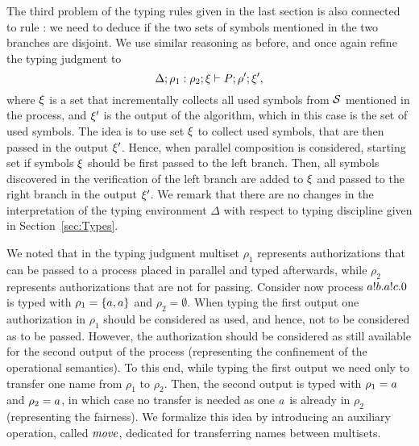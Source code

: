 The third problem of the typing rules given in the last section is also connected to rule : we need to deduce if the two sets of symbols mentioned in the two branches are disjoint. We use similar reasoning as before, and once again refine the typing judgment to 
\[
   {\Delta; \rho_1:\rho_2; \xi\vdash P ; \rho'; \xi',}
\] 
where 
$\xi$
is a set that incrementally collects all used symbols from $\cal S$ mentioned in the process, and $\xi'$ is 
the output of the algorithm, which in this case is the set of used symbols. 
%
The idea is to use set $\xi$ to collect used symbols, that are then passed in the output $\xi'$. Hence, when parallel composition is considered, starting set if symbols $\xi$ should be first passed to the left branch. Then, all symbols discovered in the verification of the left branch are added to $\xi$ and passed to the right branch in the output $\xi'$. %
We remark that there are no changes in the interpretation of the typing environment $\Delta$ with respect to typing discipline given in Section~\ref{sec:Types}.


We noted that in the typing judgment multiset $\rho_1$ represents authorizations that can be passed to a process placed in parallel and typed afterwards, while $\rho_2$ represents authorizations that are not for passing. Consider now process  $a!b.a!c.0$ is typed with $\rho_1=\{a,a\}$ and $\rho_2=\emptyset$. When typing the first output one authorization in $\rho_1$ should be considered as used, and hence, not to be considered as to be passed. However, the authorization should be considered as  still available for the second output of the process (representing the confinement of the operational semantics). To this end, while typing the first output we need only to transfer one name from $\rho_1$ to $\rho_2$. Then, the second output is typed with $\rho_1=a$ and $\rho_2=a$, in which case no transfer is needed as one $a$ is already in $\rho_2$ (representing the fairness).
We formalize this idea by introducing an auxiliary operation, called $\mathit{move}$, dedicated for transferring names between multisets. 

